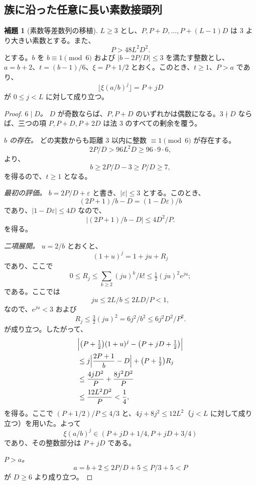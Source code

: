 \documentclass[11pt,reqno]{amsart}
\theoremstyle{definition}
\newtheorem{lemma}[theorem]{補題}
\theoremstyle{definition}
\theoremstyle{remark}
\begin{document}
\subsection{族に沿った任意に長い素数接頭列}\label{sec:E.1}

\begin{samepage}
\begin{lemma}[素数等差数列の移植]\leavevmode\label{thm:67}
\(L\ge3\) とし、\(P,P+D,\ldots,P+(L-1)D\) は \(3\) より大きい素数とする。また、
\[
P>48L^2D^2.
\]
とする。\(b\) を \(b\equiv1\pmod6\) および \(|b-2P/D|\le3\) を満たす整数とし、\(a=b+2\)、\(t=(b-1)/6\)、\(\xi=P+1/2\) とおく。このとき、\(t\ge1\)、\(P>a\) であり、
\[
\lfloor\xi(a/b)^j\rfloor=P+jD
\]
が \(0\le j<L\) に対して成り立つ。
\label{thm-end:67}
\end{lemma}
\end{samepage}

\begin{proof}\leavevmode\label{proof:67}
\emph{\(6\mid D\)。} \(D\) が奇数ならば、\(P,P+D\) のいずれかは偶数になる。\(3\nmid D\) ならば、三つの項 \(P,P+D,P+2D\) は法 \(3\) のすべての剰余を覆う。

\emph{\(b\) の存在。} どの実数からも距離 \(3\) 以内に整数 \(\equiv1\pmod6\) が存在する。
\[
2P/D>96L^2D\ge96\cdot9\cdot6,
\]
より、
\[
b\ge2P/D-3\ge P/D\ge7,
\]
を得るので、\(t\ge1\) となる。

\emph{最初の評価。} \(b=2P/D+\varepsilon\) と書き、\(|\varepsilon|\le3\) とする。このとき、
\[
(2P+1)/b-D=(1-D\varepsilon)/b
\]
であり、\(|1-D\varepsilon|\le4D\) なので、
\[
|(2P+1)/b-D|\le4D^2/P.
\]
を得る。

\emph{二項展開。} \(u=2/b\) とおくと、
\[
(1+u)^j=1+ju+R_j
\]
であり、ここで
\[
0\le R_j\le\sum_{k\ge2}(ju)^k/k!\le\tfrac12(ju)^2e^{ju};
\]
である。ここでは
\[
ju\le2L/b\le2LD/P<1,
\]
なので、\(e^{ju}<3\) および
\[
R_j\le\tfrac32(ju)^2=6j^2/b^2\le6j^2D^2/P^2.
\]
が成り立つ。したがって、
\[
\begin{aligned}
&\Bigl|\bigl(P+\tfrac12\bigr)(1+u)^j-\bigl(P+jD+\tfrac12\bigr)\Bigr|\\
&\le j\Bigl|\frac{2P+1}{b}-D\Bigr|+\bigl(P+\tfrac12\bigr)R_j\\
&\le\frac{4jD^2}{P}+\frac{8j^2D^2}{P}\\
&\le\frac{12L^2D^2}{P}<\frac14,
\end{aligned}
\]
を得る。ここで \((P+1/2)/P\le4/3\) と、\(4j+8j^2\le12L^2\)（\(j<L\) に対して成り立つ）を用いた。よって
\[
\xi(a/b)^j\in(P+jD+1/4,P+jD+3/4)
\]
であり、その整数部分は \(P+jD\) である。

\emph{\(P>a\)。}
\[
a=b+2\le2P/D+5\le P/3+5<P
\]
が \(D\ge6\) より成り立つ。\qedhere
\end{proof}
\end{document}
